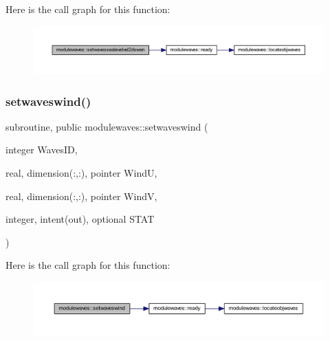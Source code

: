 Here is the call graph for this function\+:\nopagebreak
\begin{figure}[H]
\begin{center}
\leavevmode
\includegraphics[width=350pt]{namespacemodulewaves_aa5ff8156c82807bd7134751bf6b90824_cgraph}
\end{center}
\end{figure}
\mbox{\label{namespacemodulewaves_a58822c6f40408298926b3e3778be3adc}} 
\subsubsection{\texorpdfstring{setwaveswind()}{setwaveswind()}}
{\footnotesize\ttfamily subroutine, public modulewaves\+::setwaveswind (\begin{DoxyParamCaption}\item[{integer}]{Waves\+ID,  }\item[{real, dimension(\+:,\+:), pointer}]{WindU,  }\item[{real, dimension(\+:,\+:), pointer}]{WindV,  }\item[{integer, intent(out), optional}]{S\+T\+AT }\end{DoxyParamCaption})}

Here is the call graph for this function\+:\nopagebreak
\begin{figure}[H]
\begin{center}
\leavevmode
\includegraphics[width=350pt]{namespacemodulewaves_a58822c6f40408298926b3e3778be3adc_cgraph}
\end{center}
\end{figure}
\mbox{\label{namespacemodulewaves_afb65a1617589473a3eac08eef0cc3a2b}} 
